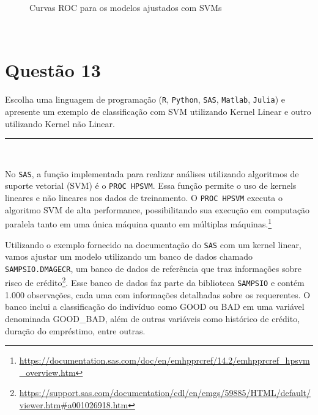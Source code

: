 \documentclass[
  a4paperpaper,
]{article}
\begin{document}
\begin{figure}[H]


\caption{\label{fig-q7d}Curvas ROC para os modelos ajustados com SVMs}

\end{figure}%

~

\section{Questão 13}\label{questuxe3o-13}

Escolha uma linguagem de programação (\texttt{R}, \texttt{Python},
\texttt{SAS}, \texttt{Matlab}, \texttt{Julia}) e apresente um exemplo de
classificação com SVM utilizando Kernel Linear e outro utilizando Kernel
não Linear.

\begin{center}\rule{0.5\linewidth}{0.5pt}\end{center}

~

No \texttt{SAS}, a função implementada para realizar análises utilizando
algoritmos de suporte vetorial (SVM) é o \texttt{PROC\ HPSVM}. Essa
função permite o uso de kernels lineares e não lineares nos dados de
treinamento. O \texttt{PROC\ HPSVM} executa o algoritmo SVM de alta
performance, possibilitando sua execução em computação paralela tanto em
uma única máquina quanto em múltiplas máquinas.\footnote{\url{https://documentation.sas.com/doc/en/emhpprcref/14.2/emhpprcref_hpsvm_overview.htm}}

Utilizando o exemplo fornecido na documentação do \texttt{SAS} com um
kernel linear, vamos ajustar um modelo utilizando um banco de dados
chamado \texttt{SAMPSIO.DMAGECR}, um banco de dados de referência que
traz informações sobre risco de crédito\footnote{\url{https://support.sas.com/documentation/cdl/en/emgs/59885/HTML/default/viewer.htm\#a001026918.htm}}.
Esse banco de dados faz parte da biblioteca \texttt{SAMPSIO} e contém
1.000 observações, cada uma com informações detalhadas sobre os
requerentes. O banco inclui a classificação do indivíduo como GOOD ou
BAD em uma variável denominada GOOD\_BAD, além de outras variáveis como
histórico de crédito, duração do empréstimo, entre outras.
\end{document}
